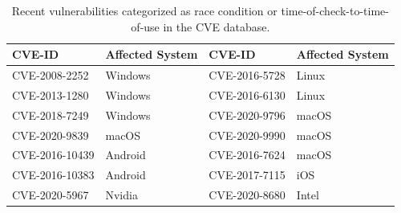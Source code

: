 \begin{center}
\begin{table}[ht]
\small
\caption{Recent vulnerabilities categorized as race condition or time-of-check-to-time-of-use in the CVE database.}
\label{table:cves}
\centering
	\begin{tabular}{@{}>{\raggedright\arraybackslash}m{2.35cm}@{}|
			@{}>{\centering\arraybackslash}m{1.35cm}@{}|
			@{}>{\centering\arraybackslash}m{2.35cm}@{}|
			@{}>{\centering\arraybackslash}m{1.25cm}@{} } 
\hline
CVE-ID & Affected System & CVE-ID & Affected System \\ %
\hline
CVE-2008-2252  & Windows & CVE-2016-5728 & Linux \\
CVE-2013-1280  & Windows & CVE-2016-6130 & Linux \\
CVE-2018-7249  & Windows & CVE-2020-9796 & macOS \\ 
CVE-2020-9839  & macOS   & CVE-2020-9990 & macOS \\
CVE-2016-10439 & Android & CVE-2016-7624 & macOS \\
CVE-2016-10383 & Android & CVE-2017-7115 & iOS \\

CVE-2020-5967  & Nvidia  & CVE-2020-8680 & Intel \\
\hline

\end{tabular}
\end{table}
\end{center}






